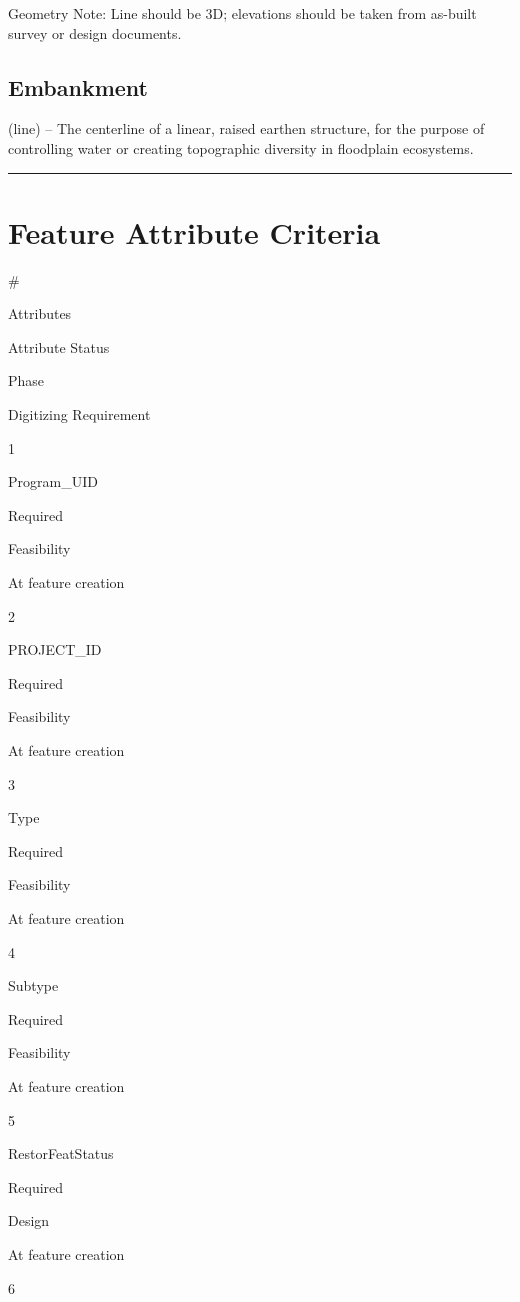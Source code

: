 \documentclass[
  letterpaper,
  DIV=11,
  numbers=noendperiod]{scrreprt}
\begin{document}
Geometry Note: Line should be 3D; elevations should be taken from
as-built survey or design documents.

\subsection{Embankment}\label{embankment-2}

(line) -- The centerline of a linear, raised earthen structure, for the
purpose of controlling water or creating topographic diversity in
floodplain ecosystems.

\begin{center}\rule{0.5\linewidth}{0.5pt}\end{center}

\section{Feature Attribute Criteria}\label{feature-attribute-criteria-2}

\#

Attributes

Attribute Status

Phase

Digitizing Requirement

1

Program\_UID

Required

Feasibility

At feature creation

2

PROJECT\_ID

Required

Feasibility

At feature creation

3

Type

Required

Feasibility

At feature creation

4

Subtype

Required

Feasibility

At feature creation

5

RestorFeatStatus

Required

Design

At feature creation

6
\end{document}
